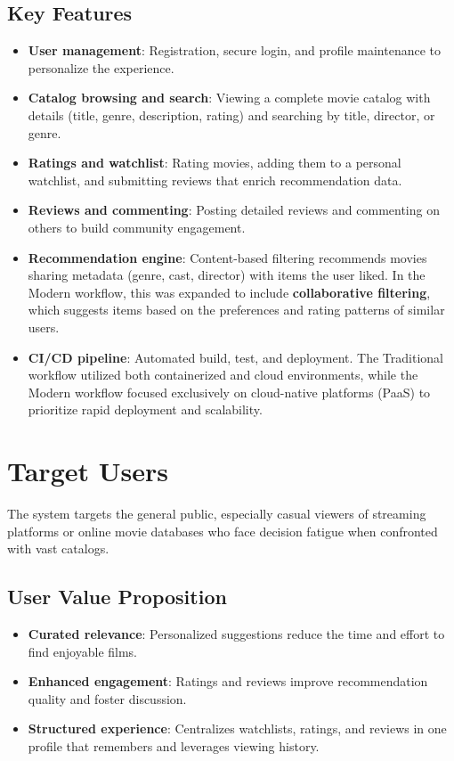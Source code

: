 \documentclass[a4paper,12pt]{report}
\begin{document}
\subsection{Key Features}
\begin{itemize}
    \item \textbf{User management}: Registration, secure login, and profile maintenance to personalize the experience.
    \item \textbf{Catalog browsing and search}: Viewing a complete movie catalog with details (title, genre, description, rating) and searching by title, director, or genre.
    \item \textbf{Ratings and watchlist}: Rating movies, adding them to a personal watchlist, and submitting reviews that enrich recommendation data.
    \item \textbf{Reviews and commenting}: Posting detailed reviews and commenting on others to build community engagement.
    \item \textbf{Recommendation engine}: Content-based filtering recommends movies sharing metadata (genre, cast, director) with items the user liked. In the Modern workflow, this was expanded to include \textbf{collaborative filtering}, which suggests items based on the preferences and rating patterns of similar users.
    \item \textbf{CI/CD pipeline}: Automated build, test, and deployment. The Traditional workflow utilized both containerized and cloud environments, while the Modern workflow focused exclusively on cloud-native platforms (PaaS) to prioritize rapid deployment and scalability.
\end{itemize}

\section{Target Users}
The system targets the general public, especially casual viewers of streaming platforms or online movie databases who face decision fatigue when confronted with vast catalogs.

\subsection{User Value Proposition}
\begin{itemize}
  \item \textbf{Curated relevance}: Personalized suggestions reduce the time and effort to find enjoyable films.
  \item \textbf{Enhanced engagement}: Ratings and reviews improve recommendation quality and foster discussion.
  \item \textbf{Structured experience}: Centralizes watchlists, ratings, and reviews in one profile that remembers and leverages viewing history.
\end{itemize}
\end{document}
